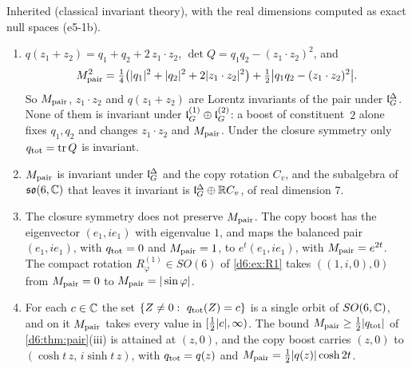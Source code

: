 Inherited (classical invariant theory), with the real dimensions computed as exact null spaces (e5-1b).

\begin{theorem}
\label{e5:thm:pair}
\begin{enumerate}[label=(\roman*),leftmargin=2.2em]
\item $q(z_1+z_2)=q_1+q_2+2\,z_1\cdot z_2$, $\det Q=q_1q_2-(z_1\cdot z_2)^2$, and
\[
M_{\rm pair}^2=\tfrac14\bigl(|q_1|^2+|q_2|^2+2|z_1\cdot z_2|^2\bigr)+\tfrac12\bigl|q_1q_2-(z_1\cdot z_2)^2\bigr| .
\]
So $M_{\rm pair}$, $z_1\cdot z_2$ and $q(z_1+z_2)$ are Lorentz invariants of the pair under $\mathfrak l_G^\Delta$. None of them is invariant under
$\mathfrak l_G^{(1)}\oplus\mathfrak l_G^{(2)}$: a boost of constituent~$2$ alone fixes $q_1,q_2$ and changes $z_1\cdot z_2$ and $M_{\rm pair}$. Under the closure
symmetry only $q_{\rm tot}=\operatorname{tr} Q$ is invariant.
\item $M_{\rm pair}$ is invariant under $\mathfrak l_G^\Delta$ and the copy rotation $C_v$, and the subalgebra of $\mathfrak{so}(6,\mathbb{C})$ that leaves it invariant
is $\mathfrak l_G^\Delta\oplus\mathbb{R} C_v$, of real dimension $7$.
\item The closure symmetry does not preserve $M_{\rm pair}$. The copy boost has the eigenvector $(e_1,ie_1)$ with eigenvalue $1$, and maps the
balanced pair $(e_1,ie_1)$, with $q_{\rm tot}=0$ and $M_{\rm pair}=1$, to $e^t(e_1,ie_1)$, with $M_{\rm pair}=e^{2t}$. The compact rotation
$R^{(1)}_\varphi\in SO(6)$ of \cref{d6:ex:R1} takes $((1,i,0),0)$ from $M_{\rm pair}=0$ to $M_{\rm pair}=|\sin\varphi|$.
\item For each $c\in\mathbb{C}$ the set $\{Z\neq0:\ q_{\rm tot}(Z)=c\}$ is a single orbit of $SO(6,\mathbb{C})$, and on it $M_{\rm pair}$ takes every value in
$[\tfrac12|c|,\infty)$. The bound $M_{\rm pair}\ge\tfrac12|q_{\rm tot}|$ of \cref{d6:thm:pair}(iii) is attained at $(z,0)$, and the copy boost
carries $(z,0)$ to $(\cosh t\,z,\,i\sinh t\,z)$, with $q_{\rm tot}=q(z)$ and $M_{\rm pair}=\tfrac12|q(z)|\cosh2t$.
\end{enumerate}
\end{theorem}

